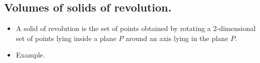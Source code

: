 \documentclass[12pt]{book}
\newcommand{\optionalDisplay}[1]{#1}
\begin{document}
\subsection{Volumes of solids of revolution.}
\begin{itemize}
\item A solid of revolution is the set of points obtained by rotating a 2-dimensional set of points lying inside a plane $P$ around an axis lying in the plane $P$.
\item Example. \label{itemExampleFigureRotationalSolid}


\optionalDisplay{

}
\end{itemize}
\end{document}
